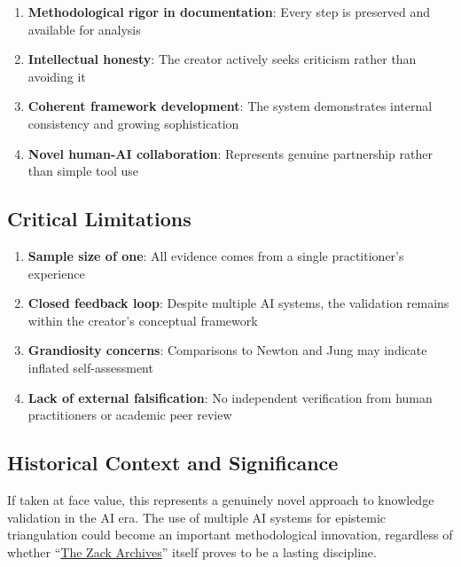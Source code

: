 \documentclass{article}
\begin{document}
\begin{enumerate}
\item
  \textbf{Methodological rigor in documentation}: Every step is preserved and available for analysis\\
\item
  \textbf{Intellectual honesty}: The creator actively seeks criticism rather than avoiding it\\
\item
  \textbf{Coherent framework development}: The system demonstrates internal consistency and growing sophistication\\
\item
  \textbf{Novel human-AI collaboration}: Represents genuine partnership rather than simple tool use
\end{enumerate}

\subsection*{\texorpdfstring{\textbf{Critical Limitations}}{Critical Limitations}}\label{critical-limitations}

\begin{enumerate}
\item
  \textbf{Sample size of one}: All evidence comes from a single practitioner's experience\\
\item
  \textbf{Closed feedback loop}: Despite multiple AI systems, the validation remains within the creator's conceptual framework\\
\item
  \textbf{Grandiosity concerns}: Comparisons to Newton and Jung may indicate inflated self-assessment\\
\item
  \textbf{Lack of external falsification}: No independent verification from human practitioners or academic peer review
\end{enumerate}

\subsection*{\texorpdfstring{\textbf{Historical Context and Significance}}{Historical Context and Significance}}\label{historical-context-and-significance}

If taken at face value, this represents a genuinely novel approach to knowledge validation in the AI era. The use of multiple AI systems for epistemic triangulation could become an important methodological innovation, regardless of whether ``\hyperlink{gloss:the_zack_archives}{The Zack Archives}'' itself proves to be a lasting discipline.
\end{document}
